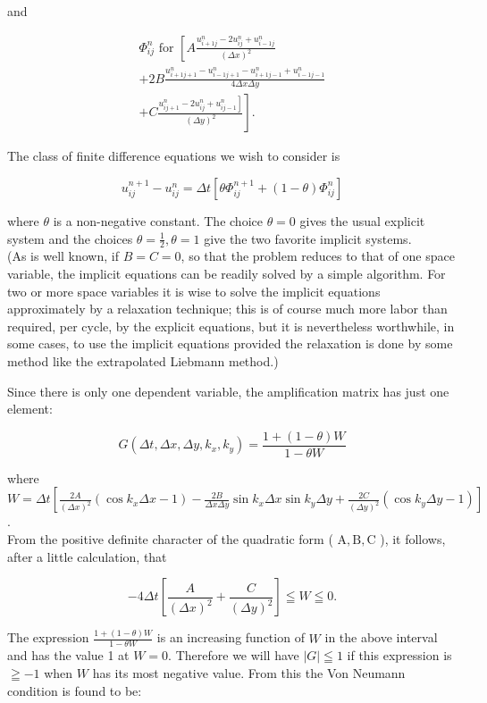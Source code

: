 \documentclass[10pt]{article}
\begin{document}
and

\[
\begin{gathered}
\Phi_{i j}^{n} \text { for }\left[A \frac{u_{i+1 j}^{n}-2 u_{i j}^{n}+u_{i-1 j}^{n}}{(\Delta x)^{2}}\right. \\
+2 B \frac{u_{i+1 j+1}^{n}-u_{i-1 j+1}^{n}-u_{i+1 j-1}^{n}+u_{i-1 j-1}^{n}}{4 \Delta x \Delta y} \\
\left.+C \frac{\left.u_{i j+1}^{n}-2 u_{i j}^{n}+u_{i j-1}^{n}\right]}{(\Delta y)^{2}}\right] .
\end{gathered}
\]

The class of finite difference equations we wish to consider is

\[
u_{i j}^{n+1}-u_{i j}^{n}=\Delta t\left[\theta \Phi_{i j}^{n+1}+(1-\theta) \Phi_{i j}^{n}\right]
\]

where \(\theta\) is a non-negative constant. The choice \(\theta=0\) gives the usual explicit system and the choices \(\theta=\frac{1}{2}, \theta=1\) give the two favorite implicit systems.\\
(As is well known, if \(B=C=0\), so that the problem reduces to that of one space variable, the implicit equations can be readily solved by a simple algorithm. For two or more space variables it is wise to solve the implicit equations approximately by a relaxation technique; this is of course much more labor than required, per cycle, by the explicit equations, but it is nevertheless worthwhile, in some cases, to use the implicit equations provided the relaxation is done by some method like the extrapolated Liebmann method.)

Since there is only one dependent variable, the amplification matrix has just one element:

\[
G\left(\Delta t, \Delta x, \Delta y, k_{x}, k_{y}\right)=\frac{1+(1-\theta) W}{1-\theta W}
\]

where\\
\(W=\Delta t\left[\frac{2 A}{(\Delta x)^{2}}\left(\cos k_{x} \Delta x-1\right)-\frac{2 B}{\Delta x \Delta y} \sin k_{x} \Delta x \sin k_{y} \Delta y+\frac{2 C}{(\Delta y)^{2}}\left(\cos k_{y} \Delta y-1\right)\right]\).\\
From the positive definite character of the quadratic form ( \(\mathrm{A}, \mathrm{B}, \mathrm{C}\) ), it follows, after a little calculation, that

\[
-4 \Delta t\left[\frac{A}{(\Delta x)^{2}}+\frac{C}{(\Delta y)^{2}}\right] \leqq W \leqq 0 .
\]

The expression \(\frac{1+(1-\theta) W}{1-\theta W}\) is an increasing function of \(W\) in the above interval and has the value 1 at \(W=0\). Therefore we will have \(|G| \leqq 1\) if this expression is \(\geqq-1\) when \(W\) has its most negative value. From this the Von Neumann condition is found to be:
\end{document}
